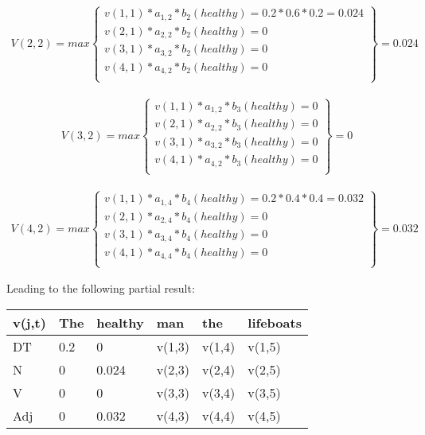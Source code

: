 \documentclass[12pt]{article}
\newenvironment{exercise}[2][Exercise]{\begin{trivlist}
\item[\hskip \labelsep {\bfseries #1}\hskip \labelsep {\bfseries #2.}]}{\end{trivlist}}
\begin{document}
\begin{exercise}{5. Viterbi}
\begin{enumerate}[label=(\alph*)]
\begin{enumerate}[label=\arabic*)]
	\begin{align*}
    V(2,2) =  max\left\{\begin{array}{lr}
        v(1,1) * a_{1,2} * b_2(healthy) = 0.2 * 0.6 * 0.2= 0.024\\
        v(2,1) * a_{2,2} * b_2(healthy) = 0 \\
        v(3,1) * a_{3,2} * b_2(healthy) = 0\\
        v(4,1) * a_{4,2} * b_2(healthy) = 0\\
        \end{array}\right\} =0.024
	\end{align*}

	\begin{align*}
    V(3,2) =  max\left\{\begin{array}{lr}
        v(1,1) * a_{1,2} * b_3(healthy) = 0\\
        v(2,1) * a_{2,2} * b_3(healthy) = 0 \\
        v(3,1) * a_{3,2} * b_3(healthy) = 0\\
        v(4,1) * a_{4,2} * b_3(healthy) = 0\\
        \end{array}\right\} = 0
	\end{align*}

	\begin{align*}
    V(4,2) =  max\left\{\begin{array}{lr}
        v(1,1) * a_{1,4} * b_4(healthy) = 0.2 * 0.4 * 0.4 = 0.032\\
        v(2,1) * a_{2,4} * b_4(healthy) = 0 \\
        v(3,1) * a_{3,4} * b_4(healthy) = 0\\
        v(4,1) * a_{4,4} * b_4(healthy) = 0\\
        \end{array}\right\} = 0.032
	\end{align*}
	
	Leading to the following partial result:
	
	\begin{table}[H]
	\centering
	\begin{tabular}{|l|l|l|l|l|l|}
	\hline
	v(j,t) & The    & healthy & man    & the    & lifeboats \\ \hline
	DT     & 0.2 & 0  & v(1,3) & v(1,4) & v(1,5)    \\ \hline
	N      & 0 & 0.024  & v(2,3) & v(2,4) & v(2,5)    \\ \hline
	V      & 0 & 0  & v(3,3) & v(3,4) & v(3,5)    \\ \hline
	Adj    & 0 & 0.032  & v(4,3) & v(4,4) & v(4,5)    \\ \hline
	\end{tabular}
	\end{table}
	

\end{enumerate}
\end{enumerate}
\end{exercise}
\end{document}
